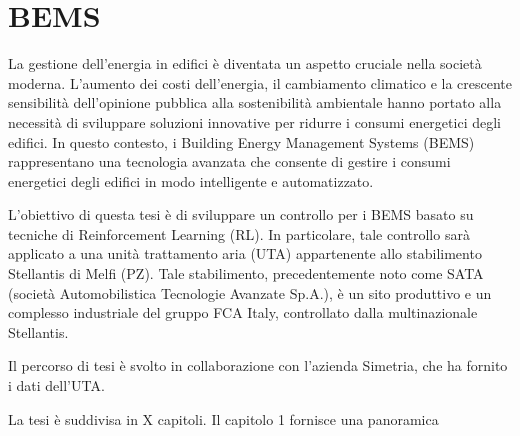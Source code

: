 \documentclass[12pt]{article}
\begin{document}
\section*{BEMS}

La gestione dell'energia in edifici è diventata un aspetto cruciale nella società moderna. 
L'aumento dei costi dell'energia, il cambiamento climatico e la crescente sensibilità dell'opinione 
pubblica alla sostenibilità ambientale hanno portato alla necessità di sviluppare soluzioni innovative 
per ridurre i consumi energetici degli edifici. In questo contesto, i Building Energy Management Systems 
(BEMS) rappresentano una tecnologia avanzata che consente di gestire i consumi energetici degli 
edifici in modo intelligente e automatizzato. 

L'obiettivo di questa tesi è di sviluppare un controllo
per i BEMS basato su tecniche di Reinforcement Learning (RL). In particolare, tale controllo sarà applicato 
a una unità trattamento aria (UTA) appartenente allo stabilimento Stellantis di Melfi (PZ). 
Tale stabilimento, precedentemente noto come SATA (società Automobilistica Tecnologie Avanzate Sp.A.),
è un sito produttivo e un complesso industriale del gruppo FCA Italy, controllato dalla multinazionale Stellantis.

Il percorso di tesi è svolto  in collaborazione con l'azienda Simetria, che ha fornito i dati dell'UTA.

La tesi è suddivisa in X capitoli. Il capitolo 1 fornisce una panoramica 
\end{document}
